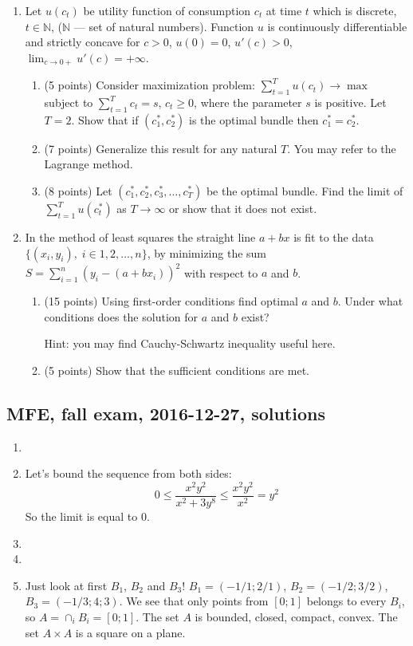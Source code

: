 \begin{enumerate}[resume]


\item Let $u(c_t)$ be utility function of consumption $c_t$ at time $t$ which is discrete, $t \in \mathbb{N}$, ($\mathbb{N}$ --- set of natural numbers).
Function $u$ is continuously differentiable and strictly concave for $c>0$, $u(0)=0$, $u'(c)>0$, $\lim_{c\to 0+ } u'(c) = +\infty$.
\begin{enumerate}
\item (5 points) Consider maximization problem: $\sum_{t=1}^T u(c_t) \to \max$ subject to $\sum_{t=1}^T c_t = s$, $c_t\geq 0$, where the parameter $s$ is positive.
Let $T=2$. Show that if $(c_1^*, c_2^*)$ is the optimal bundle then $c_1^* = c_2^*$.
\item (7 points) Generalize this result for any natural $T$. You may refer to the Lagrange method.
\item (8 points) Let $(c_1^*, c_2^*, c_3^*, \ldots, c_T^*)$  be the optimal bundle. Find the limit of $\sum_{t=1}^T u(c^*_t)$  as $T \to \infty$ or show that it does not exist.
\end{enumerate}

\item In the method of least squares the straight line $a + bx$ is fit to the data $\{ (x_i, y_i), \; i \in 1, 2, \ldots, n \}$,
by minimizing the sum $S = \sum_{i=1}^n (y_i - (a + b x_i))^2$ with respect to $a$ and $b$.
\begin{enumerate}
\item (15 points) Using first-order conditions find optimal $a$ and $b$. Under what conditions does the solution for $a$ and $b$ exist?

Hint: you may find Cauchy-Schwartz inequality useful here.
\item (5 points) Show that the sufficient conditions are met.
\end{enumerate}

\end{enumerate}


\subsection{MFE, fall exam, 2016-12-27, solutions}

\begin{enumerate}
  \item 
  \item Let's bound the sequence from both sides:
  \[
    0 \leq \frac{x^2 y^2}{x^2 + 3y^8} \leq \frac{x^2 y^2}{x^2} = y^2
  \]
  So the limit is equal to $0$.
  \item 
  \item 
  \item Just look at first $B_1$, $B_2$ and $B_3$! $B_1 = (-1/1 ; 2/1)$, $B_2 = (-1/2; 3/2)$, $B_3 = (-1/3; 4;3)$.
  We see that only points from $[0;1]$ belongs to every $B_i$, so $A = \cap_i B_i = [0;1]$.
  The set $A$ is bounded, closed, compact, convex. The set $A \times A$ is a square on a plane. 
\end{enumerate}



